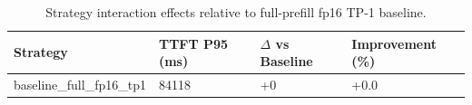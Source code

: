 \begin{table}
\caption{Strategy interaction effects relative to full-prefill fp16 TP-1 baseline.}
\label{tab:interactions}
\begin{tabular}{llll}
\toprule
Strategy & TTFT P95 (ms) & $\Delta$ vs Baseline & Improvement (\%) \\
\midrule
baseline\_full\_fp16\_tp1 & 84118 & +0 & +0.0 \\
\bottomrule
\end{tabular}
\end{table}
